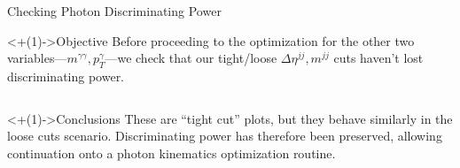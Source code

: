 \documentclass[handout]{beamer}
\begin{document}
\begin{frame}{Checking Photon Discriminating Power}
    \begin{block}<+(1)->{Objective}
        Before proceeding to the optimization for the other two variables---$m^{\gamma \gamma}, p_T^\gamma$---we check that our tight/loose $\Delta \eta^{jj}, m^{jj}$ cuts haven't lost discriminating power.
    \end{block}
    
    \bigskip
    
    \begin{columns}
    \end{columns}
    \begin{block}<+(1)->{Conclusions}
        These are ``tight cut'' plots, but they behave similarly in the loose cuts scenario. Discriminating power has therefore been preserved, allowing continuation onto a photon kinematics optimization routine.
    \end{block}
\end{frame}
\end{document}
